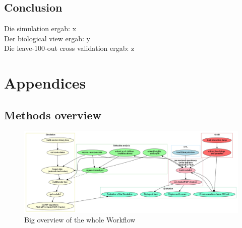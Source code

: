   \section{Conclusion}

  Die simulation ergab: x \\
  Der biological view ergab: y \\
  Die leave-100-out cross validation ergab: z



\chapter{Appendices}
  \section{Methods overview}
    \begin{figure}[h!]
      \centering
      \includegraphics[width=\textwidth]{Figures/Workflow.png}
      \caption{Big overview of the whole Workflow}
      \label{fig:BigWorkflow}
    \end{figure}

